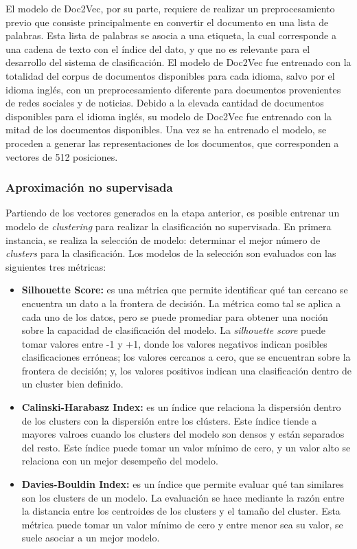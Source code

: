El modelo de Doc2Vec, por su parte, requiere de realizar un preprocesamiento previo que consiste principalmente en convertir el documento en una lista de palabras. Esta lista de palabras se asocia a una etiqueta, la cual corresponde a una cadena de texto con el índice del dato, y que no es relevante para el desarrollo del sistema de clasificación. El modelo de Doc2Vec fue entrenado con la totalidad del corpus de documentos disponibles para cada idioma, salvo por el idioma inglés, con un preprocesamiento diferente para documentos provenientes de redes sociales y de noticias. Debido a la elevada cantidad de documentos disponibles para el idioma inglés, su modelo de Doc2Vec fue entrenado con la mitad de los documentos disponibles. Una vez se ha entrenado el modelo, se proceden a generar las representaciones de los documentos, que corresponden a vectores de 512 posiciones.

\subsubsection{Aproximación no supervisada}
Partiendo de los vectores generados en la etapa anterior, es posible entrenar un modelo de \textit{clustering} para realizar la clasificación no supervisada. En primera instancia, se realiza la selección de modelo: determinar el mejor número de \textit{clusters} para la clasificación. Los modelos de la selección son evaluados con las siguientes tres métricas:

\begin{itemize}
    \item \textbf{Silhouette Score:} es una métrica que permite identificar qué tan cercano se encuentra un dato a la frontera de decisión. La métrica como tal se aplica a cada uno de los datos, pero se puede promediar para obtener una noción sobre la capacidad de clasificación del modelo. La \textit{silhouette score} puede tomar valores entre -1 y +1, donde los valores negativos indican posibles clasificaciones erróneas; los valores cercanos a cero, que se encuentran sobre la frontera de decisión; y, los valores positivos indican una clasificación dentro de un cluster bien definido. 
    \item \textbf{Calinski-Harabasz Index:} es un índice que relaciona la dispersión dentro de los clusters con la dispersión entre los clústers. Este índice tiende a mayores valroes cuando los clusters del modelo son densos y están separados del resto. Este índice puede tomar un valor mínimo de cero, y un valor alto se relaciona con un mejor desempeño del modelo.
    \item \textbf{Davies-Bouldin Index:} es un índice que permite evaluar qué tan similares son los clusters de un modelo. La evaluación se hace mediante la razón entre la distancia entre los centroides de los clusters y el tamaño del cluster. Esta métrica puede tomar un valor mínimo de cero y entre menor sea su valor, se suele asociar a un mejor modelo.
\end{itemize}

